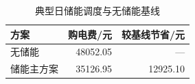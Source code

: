 \begin{table}[htbp]\centering\small
\caption{典型日储能调度与无储能基线}
\begin{tabular}{lrr}\toprule
方案 & 购电费/元 & 较基线节省/元\\\midrule
无储能 & 48052.05 & —\\
储能主方案 & 35126.95 & 12925.10\\
\bottomrule\end{tabular}\end{table}
